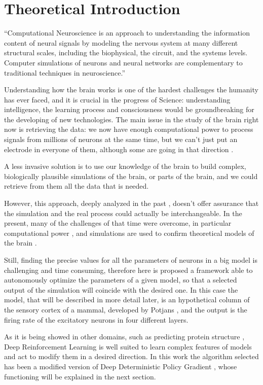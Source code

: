 \section{Theoretical Introduction}

``Computational Neuroscience is an approach to understanding the information content of neural signals by modeling the nervous system at many different structural scales, including the biophysical, the circuit, and the systems levels. Computer simulations of neurons and neural networks are complementary to traditional techniques in neuroscience.'' \cite[Series Foreword]{dayan}

Understanding how the brain works is one of the hardest challenges the humanity has ever faced, and it is crucial in the progress of Science: understanding intelligence, the learning process and consciousness would be groundbreaking for the developing of new technologies. The main issue in  the study of the brain right now is retrieving the data: we now have enough computational power to process signals from millions of neurons at the same time, but we can't just put an electrode in everyone of them, although some are going in that direction \cite{neuralink}.

A less invasive solution is to use our knowledge of the brain to build complex, biologically plausible simulations of the brain, or parts of the brain, and we could retrieve from them all the data that is needed. 

However, this approach, deeply analyzed in the past \cite{smolensky}, doesn't offer assurance that the simulation and the real process could actually be interchangeable. In the present, many of the challenges of that time were overcome, in particular computational power \cite{bluegene}, and simulations are used to confirm theoretical models of the brain \cite{pellonisz}.

Still, finding the precise values for all the parameters of neurons in a big model is challenging and time consuming, therefore here is proposed a framework able to autonomously optimize the parameters of a given model, so that a selected output of the simulation will coincide with the desired one. In this case the model, that will be described in more detail later,  is an hypothetical column of the sensory cortex of a mammal, developed by Potjans \cite{potjans}, and the output is the firing rate of the excitatory neurons in four different layers. 

As it is being showed in other domains, such as predicting protein structure \cite{alphafold}, Deep Reinforcement Learning is well suited to learn complex features of models and act to modify them in a desired direction. In this work the algorithm selected has been a modified version of Deep Deterministic Policy Gradient \cite{lillicrap}, whose functioning will be explained in the next section.


